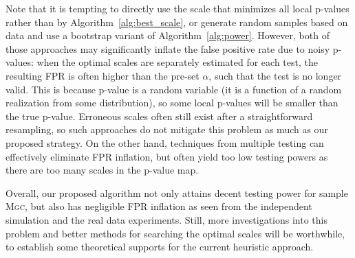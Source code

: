 \documentclass[11pt]{article}
\providecommand{\sct}[1]{{\normalfont\textsc{#1}}}
\newcommand{\Mgc}{\sct{Mgc}}
\begin{document}
Note that it is tempting to directly use the scale that minimizes all local p-values rather than by Algorithm~\ref{alg:best_scale}, or generate random samples based on  data  and use a bootstrap variant of Algorithm~\ref{alg:power}. However, both of those approaches may significantly inflate the false positive rate due to noisy p-values: when the optimal scales are separately estimated for each test, the resulting FPR is often higher than the pre-set $\alpha$, such that the test is no longer valid. This is because p-value is a random variable (it is a function of a random realization from some distribution), so some local p-values will be smaller than the true p-value. Erroneous scales often still exist after a straightforward resampling, so such approaches do not mitigate this problem as much as our proposed strategy. On the other hand, techniques from multiple testing can effectively eliminate FPR inflation, but often yield too low testing powers as there are too many scales in the p-value map.

Overall, our proposed algorithm not only attains decent testing power for sample \Mgc, but also has negligible FPR inflation as seen from the independent simulation and the real data experiments.
Still, more investigations into this problem and better methods for searching the optimal scales will be worthwhile, to establish some theoretical supports for the current heuristic approach.

\end{document}
